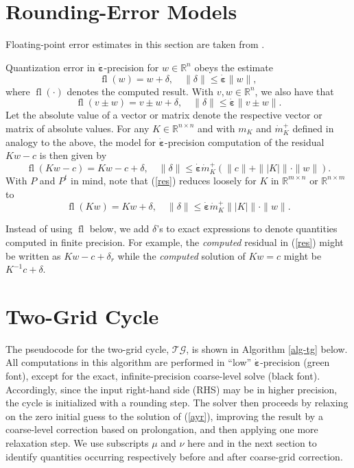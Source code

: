 \documentclass[onefignum,onetabnum]{siamart220329}
\DeclareMathOperator{\fl}{fl}
\newcommand{\ewed}{\boldsymbol{\dot{\varepsilon}}}
\renewcommand{\Re}{\mathbb{R}}
\newcommand{\tg}{$\mathcal{TG}$}
\begin{document}
{\section{Rounding-Error Models}
\label{models}
Floating-point error estimates in this section are taken from \cite[Section 2]{Higham2002}.

Quantization error in $\ewed$-precision for $w \in \Re^n$ obeys the estimate
\begin{equation}
\fl(w) = w + \delta, \quad \|\delta\| \le \ewed \|w\| ,
\label{quant}
\end{equation}
where $\fl(\cdot)$ denotes the computed result. With $v, w \in \Re^n$, we also have that
\begin{equation}
\fl(v \pm w) = v \pm w + \delta, \quad \|\delta\| \le \ewed \|v \pm w\| .
\label{pm}
\end{equation}
Let the absolute value of a vector or matrix denote the respective vector or matrix of absolute values. For any $K \in \Re^{n \times n}$ and with $m_K$ and $\dot{m}^+_K$ defined in analogy to the above, the model for $\ewed$-precision computation of the residual $Kw - c$ is then given by
\begin{equation}
\fl(Kw - c) = Kw - c + \delta, \quad \|\delta\| \le \ewed \dot{m}^+_K (\|c\| + \||K|\| \cdot \|w\|).
\label{res}
\end{equation}
With $P$ and $P^t$ in mind, note that (\ref{res}) reduces loosely for $K$ in $\Re^{m \times n}$ or $\Re^{n \times m}$ to
\begin{equation}
\fl(Kw) = Kw + \delta, \quad \|\delta\| \le \ewed \dot{m}^+_K \||K|\| \cdot \|w\|.
\label{ax}
\end{equation}

Instead of using $\fl$ below, we add $\delta$'s to exact expressions to denote quantities computed in finite precision. For example, the {\em computed} residual in (\ref{res}) might be written as $Kw - c + \delta_r$ while the {\em computed} solution of $Kw = c$ might be $K^{-1}c + \delta$.

\section{Two-Grid Cycle}
\label{tg}

The pseudocode for the two-grid cycle, {\tg}, is shown in Algorithm \ref{alg-tg} below. 
All computations in this algorithm are performed in ``low'' $\ewed$-precision (green font), except for the exact, infinite-precision coarse-level solve (black font). Accordingly, since the input right-hand side (RHS) may be in higher precision, the cycle is initialized with a rounding step. The solver then proceeds by relaxing on the zero initial guess to the solution of (\ref{ayr}), improving the result by a coarse-level correction based on prolongation, and then applying one more relaxation step. We use subscripts $\mu$ and $\nu$ here and in the next section to identify quantities occurring respectively before and after coarse-grid correction.

}
\end{document}
